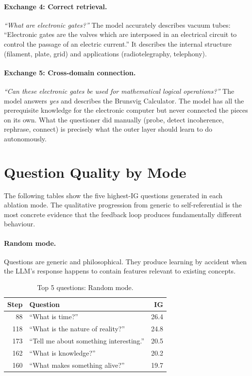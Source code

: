 \documentclass[conference]{IEEEtran}
\begin{document}
\paragraph{Exchange 4: Correct retrieval.}
\emph{``What are electronic gates?''} The model accurately describes vacuum tubes: ``Electronic gates are the valves which are interposed in an electrical circuit to control the passage of an electric current.'' It describes the internal structure (filament, plate, grid) and applications (radiotelegraphy, telephony).

\paragraph{Exchange 5: Cross-domain connection.}
\emph{``Can these electronic gates be used for mathematical logical operations?''} The model answers \emph{yes} and describes the Brunsvig Calculator. The model has all the prerequisite knowledge for the electronic computer but never connected the pieces on its own. What the questioner did manually (probe, detect incoherence, rephrase, connect) is precisely what the outer layer should learn to do autonomously.


\section{Question Quality by Mode}
\label{app:questions}

The following tables show the five highest-IG questions generated in each ablation mode. The qualitative progression from generic to self-referential is the most concrete evidence that the feedback loop produces fundamentally different behaviour.

\paragraph{Random mode.} Questions are generic and philosophical. They produce learning by accident when the LLM's response happens to contain features relevant to existing concepts.

\begin{table}[!htbp]
\centering
\caption{Top 5 questions: Random mode.}
\begin{tabular}{rp{4.5cm}r}
\toprule
\textbf{Step} & \textbf{Question} & \textbf{IG} \\
\midrule
88  & ``What is time?'' & 26.4 \\
118 & ``What is the nature of reality?'' & 24.8 \\
173 & ``Tell me about something interesting.'' & 20.5 \\
162 & ``What is knowledge?'' & 20.2 \\
160 & ``What makes something alive?'' & 19.7 \\
\bottomrule
\end{tabular}
\end{table}
\end{document}
